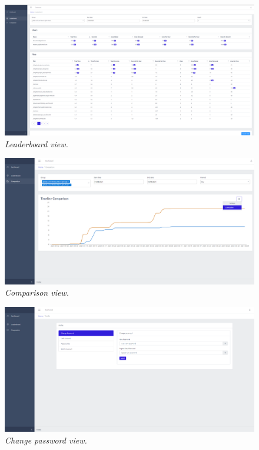 \begin{figure}[ht]
    \centering
    \includegraphics[width=1\textwidth]{figures/views/leaderboard}
    \caption{\textit{Leaderboard view.}}
    \label{fig:leaderboard}
\end{figure}

\begin{figure}[ht]
    \centering
    \includegraphics[width=1\textwidth]{figures/views/comparison}
    \caption{\textit{Comparison view.}}
    \label{fig:comparison}
\end{figure}

\begin{figure}[ht]
    \centering
    \includegraphics[width=1\textwidth]{figures/views/change_password}
    \caption{\textit{Change password view.}}
    \label{fig:change_password}
\end{figure}

